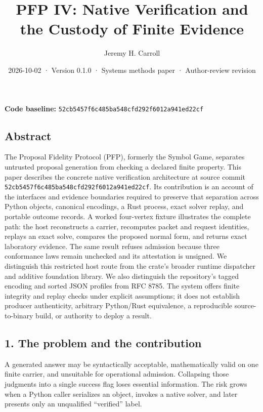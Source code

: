 \documentclass[
  11pt,
]{article}
\title{PFP IV: Native Verification and the Custody of Finite Evidence}
\author{Jeremy H. Carroll}
\date{2026-10-02 · Version 0.1.0 · Systems methods paper · Author-review
revision}
\begin{document}
\makeatletter
\begin{center}
{\LARGE \@title\par}
\vspace{0.8em}
{\normalsize \@author\par}
\vspace{0.5em}
{\small \@date\par}
\end{center}
\makeatother

\textbf{Code baseline:}
\nolinkurl{52cb5457f6c485ba548cfd292f6012a941ed22cf}

\subsection{Abstract}\label{abstract}

The Proposal Fidelity Protocol (PFP), formerly the Symbol Game,
separates untrusted proposal generation from checking a declared finite
property. This paper describes the concrete native verification
architecture at source commit
\nolinkurl{52cb5457f6c485ba548cfd292f6012a941ed22cf}. Its contribution
is an account of the interfaces and evidence boundaries required to
preserve that separation across Python objects, canonical encodings, a
Rust process, exact solver replay, and portable outcome records. A
worked four-vertex fixture illustrates the complete path: the host
reconstructs a carrier, recomputes packet and request identities,
replays an exact solve, compares the proposed normal form, and returns
exact laboratory evidence. The same result refuses admission because
three conformance laws remain unchecked and its attestation is unsigned.
We distinguish this restricted host route from the crate's broader
runtime dispatcher and additive foundation library. We also distinguish
the repository's tagged encoding and sorted JSON profiles from RFC 8785.
The system offers finite integrity and replay checks under explicit
assumptions; it does not establish producer authenticity, arbitrary
Python/Rust equivalence, a reproducible source-to-binary build, or
authority to deploy a result.

\subsection{1. The problem and the
contribution}\label{the-problem-and-the-contribution}

A generated answer may be syntactically acceptable, mathematically valid
on one finite carrier, and unsuitable for operational admission.
Collapsing those judgments into a single success flag loses essential
information. The risk grows when a Python caller serializes an object,
invokes a native solver, and later presents only an unqualified
``verified'' label.
\end{document}
